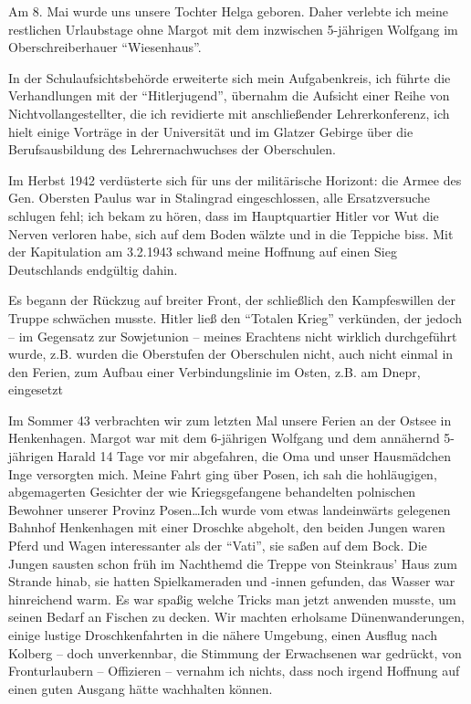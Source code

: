 Am 8. Mai wurde uns unsere Tochter Helga geboren. Daher verlebte ich meine restlichen Urlaubstage ohne Margot mit dem inzwischen 5-jährigen Wolfgang im Oberschreiberhauer \enquote{Wiesenhaus}.

In der Schulaufsichtsbehörde erweiterte sich mein Aufgabenkreis, ich führte die Verhandlungen mit der \enquote{Hitlerjugend}, übernahm die Aufsicht einer Reihe von Nichtvollangestellter, die ich revidierte mit anschließender Lehrerkonferenz, ich hielt einige Vorträge in der Universität und im Glatzer Gebirge über die Berufsausbildung des Lehrernachwuchses der Oberschulen.

Im Herbst 1942 verdüsterte sich für uns der militärische Horizont: die Armee des Gen. Obersten Paulus war in Stalingrad eingeschlossen, alle Ersatzversuche schlugen fehl; ich bekam zu hören, dass im Hauptquartier Hitler vor Wut die Nerven verloren habe, sich auf dem Boden wälzte und in die Teppiche biss. Mit der Kapitulation am 3.2.1943 schwand meine Hoffnung auf einen Sieg Deutschlands endgültig dahin.

 Es begann der Rückzug auf breiter Front, der schließlich den Kampfeswillen der Truppe schwächen musste. Hitler ließ den \enquote{Totalen Krieg} verkünden, der jedoch -- im Gegensatz zur Sowjetunion -- meines Erachtens nicht wirklich durchgeführt wurde, z.B. wurden die Oberstufen der Oberschulen nicht, auch nicht einmal in den Ferien, zum Aufbau einer Verbindungslinie im Osten, z.B. am Dnepr, eingesetzt

 Im Sommer 43 verbrachten wir zum letzten Mal unsere Ferien an der Ostsee in Henkenhagen. Margot war mit dem 6-jährigen Wolfgang und dem annähernd 5-jährigen Harald 14 Tage vor mir abgefahren, die Oma und unser Hausmädchen Inge versorgten mich. Meine Fahrt ging über Posen, ich sah die hohläugigen, abgemagerten Gesichter der wie Kriegsgefangene behandelten polnischen Bewohner unserer Provinz Posen\dots Ich wurde vom etwas landeinwärts gelegenen Bahnhof Henkenhagen mit einer Droschke abgeholt, den beiden Jungen waren Pferd und Wagen interessanter als der \enquote{Vati}, sie saßen auf dem Bock. Die Jungen sausten schon früh im Nachthemd die Treppe von Steinkraus' Haus zum Strande hinab, sie hatten Spielkameraden und -innen gefunden, das Wasser war hinreichend warm. Es war spaßig  welche Tricks man jetzt anwenden musste, um seinen Bedarf an Fischen zu decken. Wir machten erholsame Dünenwanderungen, einige lustige Droschkenfahrten in die nähere Umgebung, einen Ausflug nach Kolberg -- doch unverkennbar, die Stimmung der Erwachsenen war gedrückt, von Fronturlaubern -- Offizieren -- vernahm ich nichts, dass noch irgend Hoffnung auf einen guten Ausgang hätte wachhalten können.

